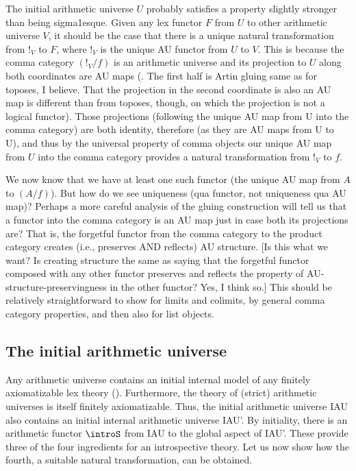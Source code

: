 \begin{TODOblock}
The initial arithmetic universe $U$ probably satisfies a property slightly stronger than being sigma1esque. Given any lex functor $F$ from $U$ to other arithmetic universe $V$, it should be the case that there is a unique natural transformation from $!_V$ to $F$, where $!_V$ is the unique AU functor from $U$ to $V$. This is because the comma category $(!_V / f)$ is an arithmetic universe and its projection to $U$ along both coordinates are AU maps (\TODO. The first half is Artin gluing same as for toposes, I believe. That the projection in the second coordinate is also an AU map is different than from toposes, though, on which the projection is not a logical functor). Those projections (following the unique AU map from U into the comma category) are both identity, therefore (as they are AU maps from U to U), and thus by the universal property of comma objects our unique AU map from $U$ into the comma category provides a natural transformation from $!_V$ to $f$.

We now know that we have at least one such functor (the unique AU map from $A$ to $(A/f)$). But how do we see uniqueness (qua functor, not uniqueness qua AU map)? Perhaps a more careful analysis of the gluing construction will tell us that a functor into the comma category is an AU map just in case both its projections are? That is, the forgetful functor from the comma category to the product category creates (i.e., preserves AND reflects) AU structure. [Is this what we want? Is creating structure the same as saying that the forgetful functor composed with any other functor preserves and reflects the property of AU-structure-preservingness in the other functor? Yes, I think so.] This should be relatively straightforward to show for limits and colimits, by general comma category properties, and then also for list objects. \TODO
\end{TODOblock}

\subsection{The initial arithmetic universe}
Any arithmetic universe contains an initial internal model of any finitely axiomatizable lex theory (). Furthermore, the theory of (strict) arithmetic universes is itself finitely axiomatizable. Thus, the initial arithmetic universe IAU also contains an initial internal arithmetic universe IAU'. By initiality, there is an arithmetic functor $\introS$ from IAU to the global aspect of IAU'. These provide three of the four ingredients for an introspective theory. Let us now show how the fourth, a suitable natural transformation, can be obtained.

